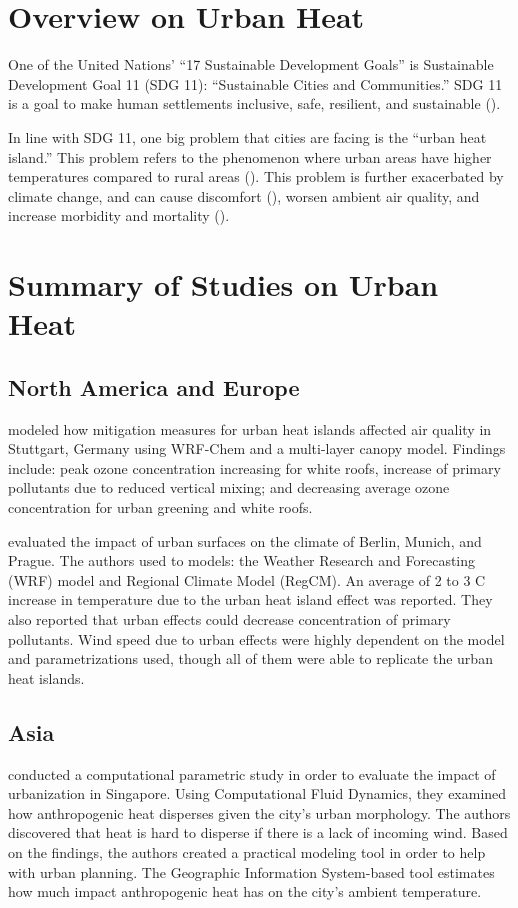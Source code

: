 \section{Overview on Urban Heat}
	One of the United Nations’ ``17 Sustainable Development Goals'' is Sustainable Development Goal 11 (SDG 11): ``Sustainable Cities and Communities.'' 
	SDG 11 is a goal to make human settlements inclusive, safe, resilient, and sustainable (\cite{Parra2021}).
	
	In line with SDG 11, one big problem that cities are facing is the ``urban heat island.'' 
	This problem refers to the phenomenon where urban areas have higher temperatures compared to rural areas (\cite{Khan2021}).
	This problem is further exacerbated by climate change, and can cause discomfort (\cite{Bhati2018}), worsen ambient air quality, and increase morbidity and mortality (\cite {Khan2021}).
	
	

\section{Summary of Studies on Urban Heat}	
	\subsection{North America and Europe}
		\textcite{Fallmann2016} modeled how mitigation measures for urban heat islands affected air quality in Stuttgart, Germany using WRF-Chem and a multi-layer canopy model. Findings include: 
			peak ozone concentration increasing for white roofs, 
			increase of primary pollutants due to reduced vertical mixing; and 
			decreasing average ozone concentration for urban greening and white roofs.
		
		\textcite{Karlicky2018} evaluated the impact of urban surfaces on the climate of Berlin, Munich, and Prague.
		The authors used to models: the Weather Research and Forecasting (WRF) model and Regional Climate Model (RegCM).
		An average of 2 to 3 \degree C increase in temperature due to the urban heat island effect was reported.
		They also reported that urban effects could decrease concentration of primary pollutants.
		Wind speed due to urban effects were highly dependent on the model and parametrizations used, though all of them were able to replicate the urban heat islands.
		
	\subsection{Asia}
		\textcite{Yuan2020} conducted a computational parametric study in order to evaluate the impact of urbanization in Singapore.
		Using Computational Fluid Dynamics, they examined how anthropogenic heat disperses given the city's urban morphology.
		The authors discovered that heat is hard to disperse if there is a lack of incoming wind.
		Based on the findings, the authors created a practical modeling tool in order to help with urban planning. 
		The Geographic Information System-based tool estimates how much impact anthropogenic heat has on the city's ambient temperature.
		
